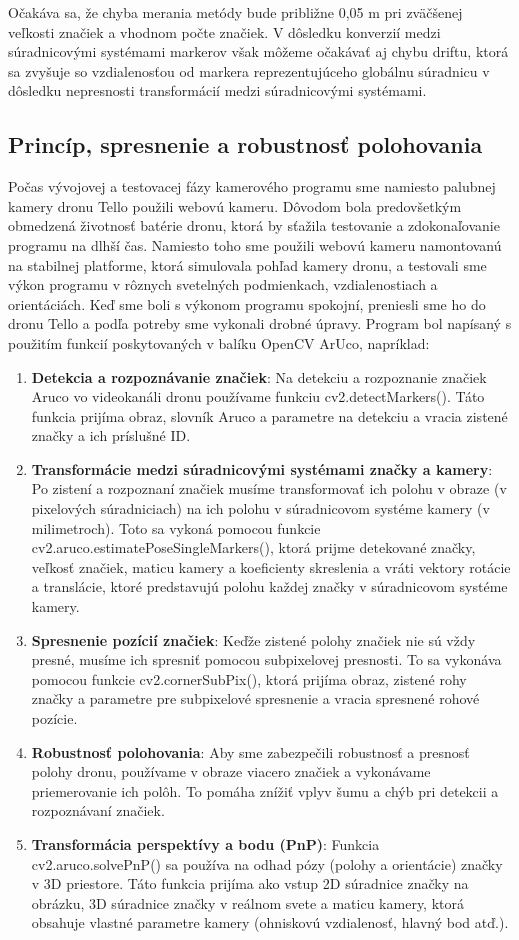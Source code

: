 {Očakáva sa, že chyba merania metódy bude približne 0,05 m pri zväčšenej veľkosti značiek a vhodnom počte značiek. V dôsledku konverzií medzi súradnicovými systémami markerov však môžeme očakávať aj chybu driftu, ktorá sa zvyšuje so vzdialenosťou od markera reprezentujúceho globálnu súradnicu v dôsledku nepresnosti transformácií medzi súradnicovými systémami.

\subsection{Princíp, spresnenie a robustnosť polohovania}
Počas vývojovej a testovacej fázy kamerového programu sme namiesto palubnej kamery dronu Tello použili webovú kameru. Dôvodom bola predovšetkým obmedzená životnosť batérie dronu, ktorá by sťažila testovanie a zdokonaľovanie programu na dlhší čas. Namiesto toho sme použili webovú kameru namontovanú na stabilnej platforme, ktorá simulovala pohľad kamery dronu, a testovali sme výkon programu v rôznych svetelných podmienkach, vzdialenostiach a orientáciách. Keď sme boli s výkonom programu spokojní, preniesli sme ho do dronu Tello a podľa potreby sme vykonali drobné úpravy.
Program bol napísaný s použitím funkcií poskytovaných v balíku OpenCV ArUco, napríklad:
\begin{enumerate}
\item \textbf{Detekcia a rozpoznávanie značiek}: Na detekciu a rozpoznanie značiek Aruco vo videokanáli dronu používame funkciu cv2.detectMarkers(). Táto funkcia prijíma obraz, slovník Aruco a parametre na detekciu a vracia zistené značky a ich príslušné ID.
\item \textbf{Transformácie medzi súradnicovými systémami značky a kamery}: Po zistení a rozpoznaní značiek musíme transformovať ich polohu v obraze (v pixelových súradniciach) na ich polohu v súradnicovom systéme kamery (v milimetroch). Toto sa vykoná pomocou funkcie cv2.aruco.estimatePoseSingleMarkers(), ktorá prijme detekované značky, veľkosť značiek, maticu kamery a koeficienty skreslenia a vráti vektory rotácie a translácie, ktoré predstavujú polohu každej značky v súradnicovom systéme kamery.
\item \textbf{Spresnenie pozícií značiek}: Keďže zistené polohy značiek nie sú vždy presné, musíme ich spresniť pomocou subpixelovej presnosti. To sa vykonáva pomocou funkcie cv2.cornerSubPix(), ktorá prijíma obraz, zistené rohy značky a parametre pre subpixelové spresnenie a vracia spresnené rohové pozície.
\item \textbf{Robustnosť polohovania}: Aby sme zabezpečili robustnosť a presnosť polohy dronu, používame v obraze viacero značiek a vykonávame priemerovanie ich polôh. To pomáha znížiť vplyv šumu a chýb pri detekcii a rozpoznávaní značiek.
\item \textbf{Transformácia perspektívy a bodu (PnP)}: Funkcia cv2.aruco.solvePnP() sa používa na odhad pózy (polohy a orientácie) značky v 3D priestore. Táto funkcia prijíma ako vstup 2D súradnice značky na obrázku, 3D súradnice značky v reálnom svete a maticu kamery, ktorá obsahuje vlastné parametre kamery (ohniskovú vzdialenosť, hlavný bod atď.).
\end{enumerate}

}
